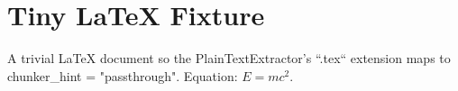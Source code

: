 \documentclass{article}
\begin{document}
\section{Tiny LaTeX Fixture}

A trivial LaTeX document so the PlainTextExtractor's ``.tex`` extension
maps to chunker_hint = "passthrough". Equation: $E = mc^2$.
\end{document}
